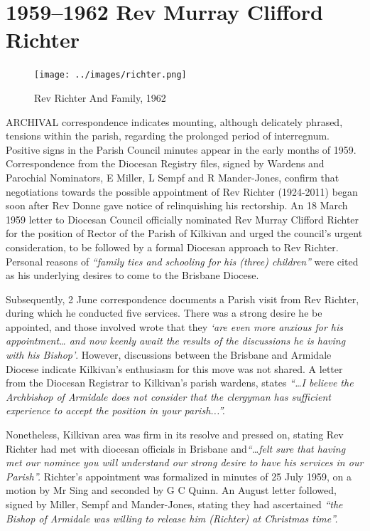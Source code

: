 \printendnotes[custom]
\setcounter{endnote}{0}
\chapter{1959--1962 Rev Murray Clifford Richter}
\nobalance








\begin{figure}
\begin{center}
\texttt{[image: ../images/richter.png]}
\caption{Rev Richter And Family, 1962}
\end{center}
\end{figure}




\lettrine[lines=3]{A}{RCHIVAL}
 correspondence indicates mounting, although delicately phrased, tensions within the parish, regarding the prolonged period of interregnum. Positive signs in the Parish Council minutes appear in the early months of 1959. Correspondence from the Diocesan Registry files, signed by Wardens and Parochial Nominators, E Miller, L Sempf and R Mander-Jones, confirm that negotiations towards the possible appointment of Rev Richter (1924-2011) began soon after Rev Donne gave notice of relinquishing his rectorship. An 18 March 1959 letter to Diocesan Council officially nominated Rev Murray Clifford Richter for the position of Rector of the Parish of Kilkivan and urged the council's urgent consideration, to be followed by a formal Diocesan approach to Rev Richter. Personal reasons of \emph{``family ties and schooling for his (three) children''} were cited as his underlying desires to come to the Brisbane Diocese.

Subsequently, 2 June correspondence documents a Parish visit from Rev Richter, during which he conducted five services. There was a strong desire he be appointed, and those involved wrote that they \emph{`are even more anxious for his appointment\ldots{} and now keenly await the results of the discussions he is having with his Bishop'}. However, discussions between the Brisbane and Armidale Diocese indicate Kilkivan's enthusiasm for this move was not shared. A letter from the Diocesan Registrar to Kilkivan's parish wardens, states \emph{``\ldots I believe the Archbishop of Armidale does not consider that the clergyman has sufficient experience to accept the position in your parish...''.}



Nonetheless, Kilkivan area was firm in its resolve and pressed on, stating Rev Richter had met with diocesan officials in Brisbane and\emph{``\ldots felt sure that having met our nominee you will understand our strong desire to have his services in our Parish''.} Richter's appointment was formalized in minutes of 25 July 1959, on a motion by Mr Sing and seconded by G C Quinn. An August letter followed, signed by Miller, Sempf and Mander-Jones, stating they had ascertained \emph{``the Bishop of Armidale was willing to release him (Richter) at Christmas time''.}



